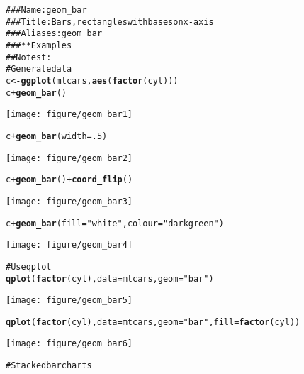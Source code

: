 \documentclass[a4paper,titlepage]{tufte-handout}\usepackage{graphicx, color}
\makeatletter
\def\maxwidth{ %
  \ifdim\Gin@nat@width>\linewidth
    \linewidth
  \else
    \Gin@nat@width
  \fi
}
\newcommand{\hlfunctioncall}[1]{\textcolor[rgb]{0.501960784313725,0,0.329411764705882}{\textbf{#1}}}%
\newcommand{\hlstring}[1]{\textcolor[rgb]{0.6,0.6,1}{#1}}%
\newcommand{\hlcomment}[1]{\textcolor[rgb]{0.180392156862745,0.6,0.341176470588235}{#1}}%
\newenvironment{kframe}{%
 \def\at@end@of@kframe{}%
 \ifinner\ifhmode%
  \def\at@end@of@kframe{\end{minipage}}%
  \begin{minipage}{\columnwidth}%
 \fi\fi%
 \def\FrameCommand##1{\hskip\@totalleftmargin \hskip-\fboxsep
 \colorbox{shadecolor}{##1}\hskip-\fboxsep
     \hskip-\linewidth \hskip-\@totalleftmargin \hskip\columnwidth}%
 \MakeFramed {\advance\hsize-\width
   \@totalleftmargin\z@ \linewidth\hsize
   \@setminipage}}%
 {\par\unskip\endMakeFramed%
 \at@end@of@kframe}
\newenvironment{knitrout}{}{} %
\makeatother
\begin{document}
\begin{knitrout}
\color{fgcolor}\begin{kframe}
\begin{alltt}
\hlcomment{### Name: geom_bar}
\hlcomment{### Title: Bars, rectangles with bases on x-axis}
\hlcomment{### Aliases: geom_bar}
\hlcomment{### ** Examples}
\hlcomment{## No test: }
\hlcomment{# Generate data}
c <- \hlfunctioncall{ggplot}(mtcars, \hlfunctioncall{aes}(\hlfunctioncall{factor}(cyl)))
c + \hlfunctioncall{geom_bar}()
\end{alltt}
\end{kframe}\texttt{[image: figure/geom\_bar1]} \begin{kframe}\begin{alltt}
c + \hlfunctioncall{geom_bar}(width=.5)
\end{alltt}
\end{kframe}\texttt{[image: figure/geom\_bar2]} \begin{kframe}\begin{alltt}
c + \hlfunctioncall{geom_bar}() + \hlfunctioncall{coord_flip}()
\end{alltt}
\end{kframe}\texttt{[image: figure/geom\_bar3]} \begin{kframe}\begin{alltt}
c + \hlfunctioncall{geom_bar}(fill=\hlstring{"white"}, colour=\hlstring{"darkgreen"})
\end{alltt}
\end{kframe}\texttt{[image: figure/geom\_bar4]} \begin{kframe}\begin{alltt}
\hlcomment{# Use qplot}
\hlfunctioncall{qplot}(\hlfunctioncall{factor}(cyl), data=mtcars, geom=\hlstring{"bar"})
\end{alltt}
\end{kframe}\texttt{[image: figure/geom\_bar5]} \begin{kframe}\begin{alltt}
\hlfunctioncall{qplot}(\hlfunctioncall{factor}(cyl), data=mtcars, geom=\hlstring{"bar"}, fill=\hlfunctioncall{factor}(cyl))
\end{alltt}
\end{kframe}\texttt{[image: figure/geom\_bar6]} \begin{kframe}\begin{alltt}
\hlcomment{# Stacked bar charts}

\end{alltt}
\end{kframe}
\end{knitrout}
\end{document}
